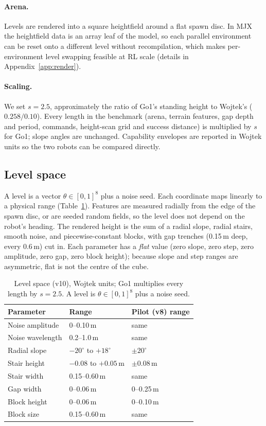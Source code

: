 \paragraph{Arena.}
Levels are rendered into a square heightfield around a flat spawn disc.
In MJX the heightfield data is an array leaf of the model, so each
parallel environment can be reset onto a different level without
recompilation, which makes per-environment level swapping feasible at RL
scale (details in Appendix~\ref{app:render}).

\paragraph{Scaling.}
We set $s = 2.5$, approximately the ratio of Go1's standing height to
Wojtek's ($0.258/0.10$).
Every length in the benchmark (arena, terrain features, gap depth and
period, commands, height-scan grid and success distance) is multiplied by
$s$ for Go1; slope angles are unchanged. Capability envelopes are reported
in Wojtek units so the two robots can be compared directly.

\subsection{Level space}
\label{sec:levelspace}

A level is a vector $\theta\in[0,1]^8$ plus a noise seed. Each coordinate
maps linearly to a physical range (Table~\ref{tab:levelspace}). Features are
measured radially from the edge of the spawn disc, or are seeded random
fields, so the level does not depend on the robot's heading. The rendered
height is the sum of a radial slope, radial stairs, smooth noise, and
piecewise-constant blocks, with gap trenches (0.15\,m deep, every 0.6\,m)
cut in. Each parameter has a \emph{flat} value (zero slope, zero step,
zero amplitude, zero gap, zero block height); because slope and step ranges
are asymmetric, flat is not the centre of the cube.

\begin{table}[t]
  \centering\small
  \caption{Level space (v10), Wojtek units; Go1 multiplies every length by
  $s=2.5$. A level is $\theta\in[0,1]^8$ plus a noise seed.}
  \label{tab:levelspace}
  \begin{tabular}{lll}
    \toprule
    Parameter & Range & Pilot (v8) range \\
    \midrule
    Noise amplitude & 0--0.10\,m & same \\
    Noise wavelength & 0.2--1.0\,m & same \\
    Radial slope & $-20^\circ$ to $+18^\circ$ & $\pm20^\circ$ \\
    Stair height & $-0.08$ to $+0.05$\,m & $\pm0.08$\,m \\
    Stair width & 0.15--0.60\,m & same \\
    Gap width & 0--0.06\,m & 0--0.25\,m \\
    Block height & 0--0.06\,m & 0--0.10\,m \\
    Block size & 0.15--0.60\,m & same \\
    \bottomrule
  \end{tabular}
\end{table}

